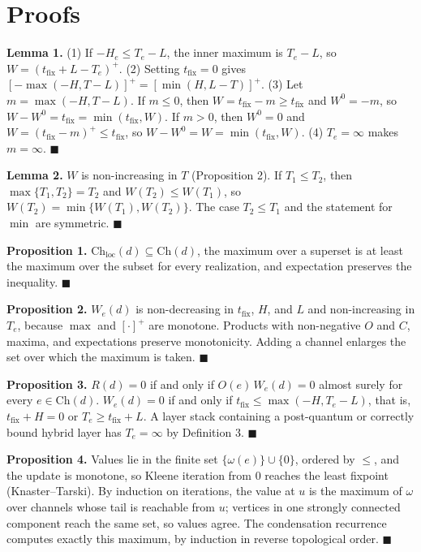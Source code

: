 \documentclass[conference]{IEEEtran}
\newcommand{\tfix}{t_{\mathrm{fix}}}
\newcommand{\Ch}{\mathrm{Ch}}
\newcommand{\pos}[1]{\left[#1\right]^{+}}
\providecommand{\gt}{}\renewcommand{\gt}{>}
\newenvironment{envblock}{\par\smallskip\noindent\ignorespaces}{\par\smallskip}
\begin{document}
\section{Proofs}\label{app:B}

\begin{envblock}

\textbf{Lemma 1.} (1) If $-H_e \le T_e - L$, the inner maximum is $T_e - L$, so $W = (\tfix + L - T_e)^+$. (2) Setting $\tfix = 0$ gives $\pos{-\max(-H, T - L)} = \pos{\min(H, L - T)}$. (3) Let $m = \max(-H, T - L)$. If $m \le 0$, then $W = \tfix - m \ge \tfix$ and $W^0 = -m$, so $W - W^0 = \tfix = \min(\tfix, W)$. If $m \gt 0$, then $W^0 = 0$ and $W = (\tfix - m)^+ \le \tfix$, so $W - W^0 = W = \min(\tfix, W)$. (4) $T_e = \infty$ makes $m = \infty$. \hfill$\blacksquare$

\textbf{Lemma 2.} $W$ is non-increasing in $T$ (Proposition 2). If $T_1 \le T_2$, then $\max\{T_1, T_2\} = T_2$ and $W(T_2) \le W(T_1)$, so $W(T_2) = \min\{W(T_1), W(T_2)\}$. The case $T_2 \le T_1$ and the statement for $\min$ are symmetric. \hfill$\blacksquare$

\textbf{Proposition 1.} $\Ch_{\mathrm{loc}}(d) \subseteq \Ch(d)$, the maximum over a superset is at least the maximum over the subset for every realization, and expectation preserves the inequality. \hfill$\blacksquare$

\textbf{Proposition 2.} $W_e(d)$ is non-decreasing in $\tfix$, $H$, and $L$ and non-increasing in $T_e$, because $\max$ and $[\cdot]^+$ are monotone. Products with non-negative $O$ and $C$, maxima, and expectations preserve monotonicity. Adding a channel enlarges the set over which the maximum is taken. \hfill$\blacksquare$

\textbf{Proposition 3.} $R(d) = 0$ if and only if $O(e)\,W_e(d) = 0$ almost surely for every $e \in \Ch(d)$. $W_e(d) = 0$ if and only if $\tfix \le \max(-H, T_e - L)$, that is, $\tfix + H = 0$ or $T_e \ge \tfix + L$. A layer stack containing a post-quantum or correctly bound hybrid layer has $T_e = \infty$ by Definition 3. \hfill$\blacksquare$

\textbf{Proposition 4.} Values lie in the finite set $\{\omega(e)\} \cup \{0\}$, ordered by $\le$, and the update is monotone, so Kleene iteration from 0 reaches the least fixpoint (Knaster–Tarski). By induction on iterations, the value at $u$ is the maximum of $\omega$ over channels whose tail is reachable from $u$; vertices in one strongly connected component reach the same set, so values agree. The condensation recurrence computes exactly this maximum, by induction in reverse topological order. \hfill$\blacksquare$


\end{envblock}
\end{document}
